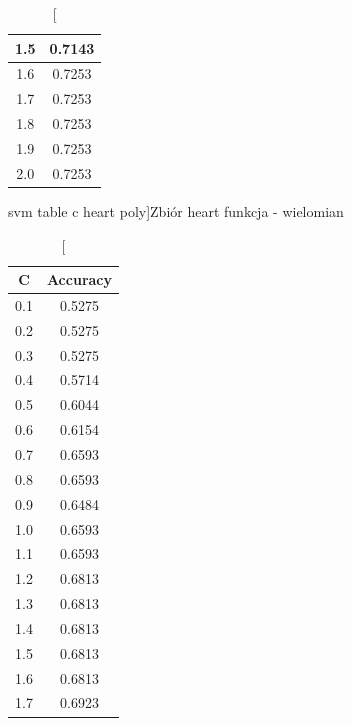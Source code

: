 \documentclass{classrep}
\begin{document}
{{\begin{table}[!htbp]
\begin{minipage}{.35\textwidth}
\begin{tabular}{|c|c|}
                        1.5 & 0.7143 \\ \hline
                        1.6 & 0.7253 \\ \hline
                        1.7 & 0.7253 \\ \hline
                        1.8 & 0.7253 \\ \hline
                        1.9 & 0.7253 \\ \hline
                        2.0 & 0.7253 \\ \hline
                    \end{tabular}
                    \caption
                    [svm table c heart poly]{Zbiór heart funkcja - wielomian}
                    \label{svm_table_c_heart_poly}
                \end{minipage}
                \hfill
                \begin{minipage}{.3\textwidth}
                    \centering
                    \begin{tabular}{|c|c|}
                        \hline
                        C & Accuracy \\ \hline
                        0.1 & 0.5275 \\ \hline
                        0.2 & 0.5275 \\ \hline
                        0.3 & 0.5275 \\ \hline
                        0.4 & 0.5714 \\ \hline
                        0.5 & 0.6044 \\ \hline
                        0.6 & 0.6154 \\ \hline
                        0.7 & 0.6593 \\ \hline
                        0.8 & 0.6593 \\ \hline
                        0.9 & 0.6484 \\ \hline
                        1.0 & 0.6593 \\ \hline
                        1.1 & 0.6593 \\ \hline
                        1.2 & 0.6813 \\ \hline
                        1.3 & 0.6813 \\ \hline
                        1.4 & 0.6813 \\ \hline
                        1.5 & 0.6813 \\ \hline
                        1.6 & 0.6813 \\ \hline
                        1.7 & 0.6923 \\ \hline

\end{tabular}
\end{minipage}
\end{table}}}
\end{document}
